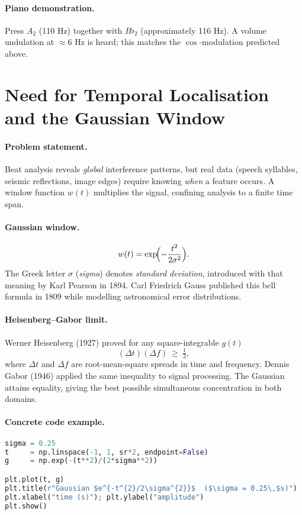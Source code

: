 \documentclass[11pt]{article}
\begin{document}
\paragraph{Piano demonstration.}
Press \(A_2\) (110 Hz) together with \(B\flat_2\) (approximately 116 Hz).
A volume undulation at \(\approx 6\) Hz is heard; this matches the
\(\cos\)-modulation predicted above.

\section{Need for Temporal Localisation and the Gaussian Window}

\paragraph{Problem statement.}
Beat analysis reveals \emph{global} interference patterns, but real data
(speech syllables, seismic reflections, image edges) require knowing
\emph{when} a feature occurs.  A window function \(w(t)\) multiplies the
signal, confining analysis to a finite time span.

\paragraph{Gaussian window.}
\[
w(t)=\exp\!\Bigl(-\frac{t^{2}}{2\sigma^{2}}\Bigr).
\]
The Greek letter \( \sigma \) (\emph{sigma}) denotes \emph{standard
deviation}, introduced with that meaning by Karl Pearson in 1894.  Carl
Friedrich Gauss published this bell formula in 1809 while modelling
astronomical error distributions.

\paragraph{Heisenberg–Gabor limit.}
Werner Heisenberg (1927) proved for any square-integrable \(g(t)\)
\[
(\Delta t)(\Delta f)\ \ge\ \tfrac12,
\]
where \(\Delta t\) and \(\Delta f\) are root-mean-square spreads in time
and frequency.  Dennis Gabor (1946) applied the same inequality to signal
processing.  The Gaussian attains equality, giving the best possible
simultaneous concentration in both domains.

\paragraph{Concrete code example.}
\begin{lstlisting}[language=Python,caption={Plot of Gaussian window with σ = 0.25 s}]
sigma = 0.25
t     = np.linspace(-1, 1, sr*2, endpoint=False)
g     = np.exp(-(t**2)/(2*sigma**2))

plt.plot(t, g)
plt.title(r"Gaussian $e^{-t^{2}/2\sigma^{2}}$  ($\sigma = 0.25\,$s)")
plt.xlabel("time (s)"); plt.ylabel("amplitude")
plt.show()
\end{lstlisting}
\end{document}
